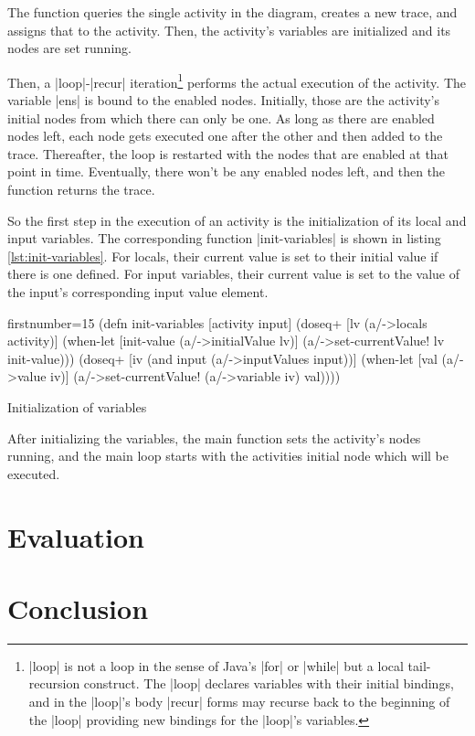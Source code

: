 \documentclass[submission]{eptcs}
\newcommand{\code}{\clojureinline}
\begin{document}
The function queries the single activity in the diagram, creates a new trace,
and assigns that to the activity.  Then, the activity's variables are
initialized and its nodes are set running.

Then, a \code|loop|-\code|recur| iteration\footnote{\code|loop| is not a loop
  in the sense of Java's \code|for| or \code|while| but a local tail-recursion
  construct.  The \code|loop| declares variables with their initial bindings,
  and in the \code|loop|'s body \code|recur| forms may recurse back to the
  beginning of the \code|loop| providing new bindings for the \code|loop|'s
  variables.} performs the actual execution of the activity.  The variable
\code|ens| is bound to the enabled nodes.  Initially, those are the activity's
initial nodes from which there can only be one.  As long as there are enabled
nodes left, each node gets executed one after the other and then added to the
trace.  Thereafter, the loop is restarted with the nodes that are enabled at
that point in time.  Eventually, there won't be any enabled nodes left, and
then the function returns the trace.

So the first step in the execution of an activity is the initialization of its
local and input variables.  The corresponding function \code|init-variables| is
shown in listing \vref{lst:init-variables}.  For locals, their current value is
set to their initial value if there is one defined.  For input variables, their
current value is set to the value of the input's corresponding input value
element.

\begin{listing}[h!tb]
\begin{clojurecode*}{firstnumber=15}
(defn init-variables [activity input]
  (doseq+ [lv (a/->locals activity)]
    (when-let [init-value (a/->initialValue lv)]
      (a/->set-currentValue! lv init-value)))
  (doseq+ [iv (and input (a/->inputValues input))]
    (when-let [val (a/->value iv)]
      (a/->set-currentValue! (a/->variable iv) val))))
\end{clojurecode*}
\caption{Initialization of variables}
\label{lst:init-variables}
\end{listing}

After initializing the variables, the main function sets the activity's nodes
running, and the main loop starts with the activities initial node which will
be executed.


\section{Evaluation}
\label{sec:evaluation}



\section{Conclusion}
\label{sec:conclusion}





\end{document}
